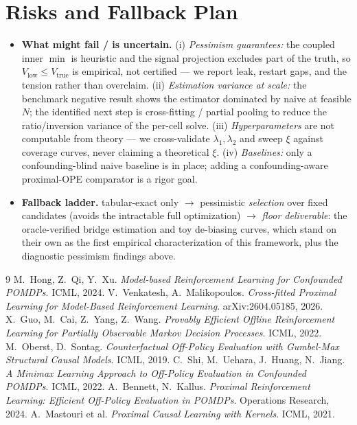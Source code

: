 \documentclass[10pt]{article}
\begin{document}
\section{Risks and Fallback Plan}

\begin{itemize}
  \item \textbf{What might fail / is uncertain.} (i) \emph{Pessimism guarantees:} the coupled inner $\min$ is
  heuristic and the signal projection excludes part of the truth, so $V_{\mathrm{low}}\le V_{\mathrm{true}}$ is
  empirical, not certified --- we report leak, restart gaps, and the tension rather than overclaim. (ii)
  \emph{Estimation variance at scale:} the benchmark negative result shows the estimator dominated by naive at
  feasible $N$; the identified next step is cross-fitting / partial pooling to reduce the ratio/inversion
  variance of the per-cell solve. (iii) \emph{Hyperparameters} are not computable from theory --- we
  cross-validate $\lambda_1,\lambda_2$ and sweep $\xi$ against coverage curves, never claiming a theoretical
  $\xi$. (iv) \emph{Baselines:} only a confounding-blind naive baseline is in place; adding a confounding-aware
  proximal-OPE comparator is a rigor goal.
  \item \textbf{Fallback ladder.} tabular-exact only $\to$ pessimistic \emph{selection} over fixed candidates
  (avoids the intractable full optimization) $\to$ \emph{floor deliverable}: the oracle-verified bridge
  estimation and toy de-biasing curves, which stand on their own as the first empirical characterization of
  this framework, plus the diagnostic pessimism findings above.
\end{itemize}

\begin{thebibliography}{9}
\small
{} M.~Hong, Z.~Qi, Y.~Xu.
\textit{Model-based Reinforcement Learning for Confounded POMDPs}. ICML, 2024.
 V.~Venkatesh, A.~Malikopoulos.
\textit{Cross-fitted Proximal Learning for Model-Based Reinforcement Learning}. arXiv:2604.05185, 2026.
 X.~Guo, M.~Cai, Z.~Yang, Z.~Wang.
\textit{Provably Efficient Offline Reinforcement Learning for Partially Observable Markov Decision Processes}.
ICML, 2022.
 M.~Oberst, D.~Sontag.
\textit{Counterfactual Off-Policy Evaluation with Gumbel-Max Structural Causal Models}. ICML, 2019.
 C.~Shi, M.~Uehara, J.~Huang, N.~Jiang.
\textit{A Minimax Learning Approach to Off-Policy Evaluation in Confounded POMDPs}. ICML, 2022.
 A.~Bennett, N.~Kallus.
\textit{Proximal Reinforcement Learning: Efficient Off-Policy Evaluation in POMDPs}.
Operations Research, 2024.
 A.~Mastouri et al.
\textit{Proximal Causal Learning with Kernels}. ICML, 2021.
\end{thebibliography}
\end{document}
